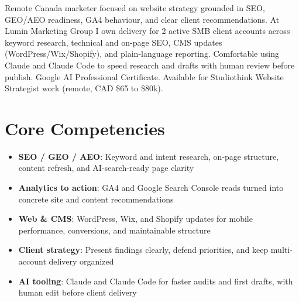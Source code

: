 \documentclass[11pt,a4paper,sans]{moderncv}
\begin{document}
\makecvtitle

\vspace{6pt}
\small{Remote Canada marketer focused on website strategy grounded in SEO, GEO/AEO readiness, GA4 behaviour, and clear client recommendations. At Lumin Marketing Group I own delivery for 2 active SMB client accounts across keyword research, technical and on-page SEO, CMS updates (WordPress/Wix/Shopify), and plain-language reporting. Comfortable using Claude and Claude Code to speed research and drafts with human review before publish. Google AI Professional Certificate. Available for Studiothink Website Strategist work (remote, CAD \$65 to \$80k).}

\section{Core Competencies}
\vspace{1pt}
\begin{itemize}
\item \textbf{SEO / GEO / AEO}: Keyword and intent research, on-page structure, content refresh, and AI-search-ready page clarity
\item \textbf{Analytics to action}: GA4 and Google Search Console reads turned into concrete site and content recommendations
\item \textbf{Web \& CMS}: WordPress, Wix, and Shopify updates for mobile performance, conversions, and maintainable structure
\item \textbf{Client strategy}: Present findings clearly, defend priorities, and keep multi-account delivery organized
\item \textbf{AI tooling}: Claude and Claude Code for faster audits and first drafts, with human edit before client delivery
\end{itemize}
\end{document}
